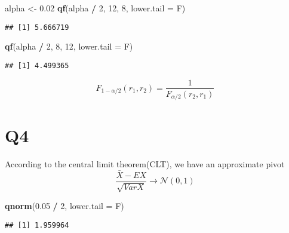 \documentclass[
]{book}
\newenvironment{Shaded}{\begin{snugshade}}{\end{snugshade}}
\newcommand{\DataTypeTok}[1]{\textcolor[rgb]{0.13,0.29,0.53}{#1}}
\newcommand{\DecValTok}[1]{\textcolor[rgb]{0.00,0.00,0.81}{#1}}
\newcommand{\FloatTok}[1]{\textcolor[rgb]{0.00,0.00,0.81}{#1}}
\newcommand{\KeywordTok}[1]{\textcolor[rgb]{0.13,0.29,0.53}{\textbf{#1}}}
\newcommand{\NormalTok}[1]{#1}
\newcommand{\OperatorTok}[1]{\textcolor[rgb]{0.81,0.36,0.00}{\textbf{#1}}}
\newcommand{\StringTok}[1]{\textcolor[rgb]{0.31,0.60,0.02}{#1}}
\theoremstyle{definition}
\theoremstyle{definition}
\theoremstyle{definition}
\theoremstyle{remark}
\begin{document}
\begin{Shaded}
\begin{Highlighting}[]
\NormalTok{alpha <{-}}\StringTok{ }\FloatTok{0.02}
\KeywordTok{qf}\NormalTok{(alpha }\OperatorTok{/}\StringTok{ }\DecValTok{2}\NormalTok{, }\DecValTok{12}\NormalTok{, }\DecValTok{8}\NormalTok{, }\DataTypeTok{lower.tail =}\NormalTok{ F)}
\end{Highlighting}
\end{Shaded}

\begin{verbatim}
## [1] 5.666719
\end{verbatim}

\begin{Shaded}
\begin{Highlighting}[]
\KeywordTok{qf}\NormalTok{(alpha }\OperatorTok{/}\StringTok{ }\DecValTok{2}\NormalTok{, }\DecValTok{8}\NormalTok{, }\DecValTok{12}\NormalTok{, }\DataTypeTok{lower.tail =}\NormalTok{ F)}
\end{Highlighting}
\end{Shaded}

\begin{verbatim}
## [1] 4.499365
\end{verbatim}

\begin{equation}
F_{1-\alpha / 2}(r_1, r_2) = \frac{1}{F_{\alpha / 2}(r_2, r_1)}
\end{equation}

\hypertarget{q4}{%
\section{Q4}\label{q4}}

According to the central limit theorem(CLT), we have an approximate pivot
\begin{equation}
\frac{\bar X - EX}{\sqrt{Var X}}\rightarrow \mathcal{N}(0,1)
\end{equation}

\begin{Shaded}
\begin{Highlighting}[]
\KeywordTok{qnorm}\NormalTok{(}\FloatTok{0.05} \OperatorTok{/}\StringTok{ }\DecValTok{2}\NormalTok{, }\DataTypeTok{lower.tail =}\NormalTok{ F)}
\end{Highlighting}
\end{Shaded}

\begin{verbatim}
## [1] 1.959964
\end{verbatim}
\end{document}
